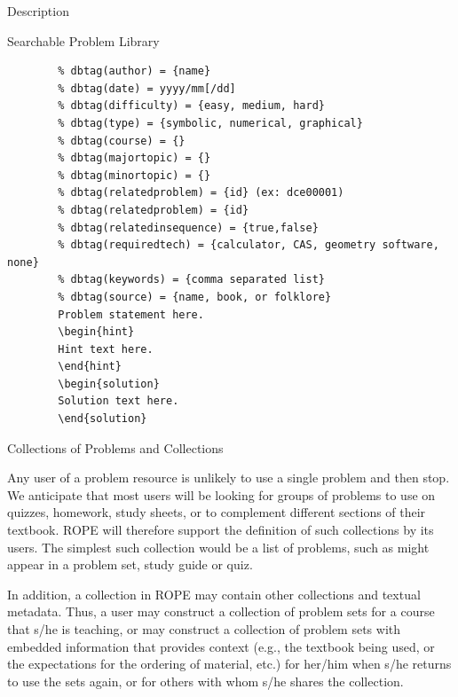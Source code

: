 \documentclass[11pt]{article}
\begin{document}
\begin{section}{Description}
\begin{subsection}{Searchable Problem Library}
\begin{table}
\begin{center}
\baselineskip
\begin{verbatim}
        % dbtag(author) = {name}
        % dbtag(date) = yyyy/mm[/dd]
        % dbtag(difficulty) = {easy, medium, hard}
        % dbtag(type) = {symbolic, numerical, graphical}
        % dbtag(course) = {}
        % dbtag(majortopic) = {}
        % dbtag(minortopic) = {}
        % dbtag(relatedproblem) = {id} (ex: dce00001)
        % dbtag(relatedproblem) = {id}
        % dbtag(relatedinsequence) = {true,false}
        % dbtag(requiredtech) = {calculator, CAS, geometry software, none}
        % dbtag(keywords) = {comma separated list}
        % dbtag(source) = {name, book, or folklore}
        Problem statement here.
        \begin{hint}
        Hint text here.
        \end{hint}
        \begin{solution}
        Solution text here.
        \end{solution}
\end{verbatim}
\baselineskip
\end{center}
\caption{Sample ROPE problem template}
\label{metadata}
\end{table}


\end{subsection}

\begin{subsection}{Collections of Problems and Collections}

Any user of a problem resource is unlikely to use a single problem and
then stop.  We anticipate that most users will be looking for groups of
problems to use on quizzes, homework, study sheets, or to complement
different sections of their textbook.  ROPE will therefore support the
definition of such collections by its users.  The simplest such collection
would be a list of problems, such as might appear in a problem set, study
guide or quiz.

In addition, a collection in ROPE may contain other collections and
textual metadata.  Thus, a user may construct a collection of problem sets
for a course that s/he is teaching, or may construct a collection of
problem sets with embedded information that provides context (e.g., the
textbook being used, or the expectations for the ordering of material,
etc.) for her/him when s/he returns to use the sets again, or for others
with whom s/he shares the collection.


\end{subsection}
\end{section}
\end{document}
